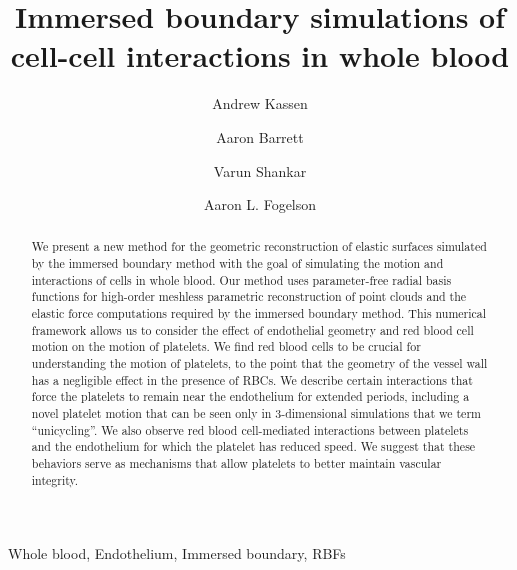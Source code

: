 \documentclass[1p,preprint,fleqn,number,sort&compress,times]{elsarticle}
\begin{document}
\begin{frontmatter}

\title{Immersed boundary simulations of cell-cell interactions in whole blood}

\author[1]{Andrew Kassen}  
\author[1]{Aaron Barrett}               
\author[2]{Varun Shankar}               
\author[1]{Aaron L. Fogelson}  

\address[1]{Department of Mathematics, University of Utah, Salt Lake City, UT 84112, USA}
\address[2]{School of Computing, University of Utah, Salt Lake City, UT 84112, USA}
\address[3]{Department of Bioengineering, University of Utah, Salt Lake City, UT 84112, USA}


\begin{abstract}
We present a new method for the geometric reconstruction of elastic surfaces simulated by
the immersed boundary method with the goal of simulating the motion and interactions of
cells in whole blood. Our method uses parameter-free radial basis functions for
high-order meshless parametric reconstruction of point clouds and the elastic force
computations required by the immersed boundary method. This numerical framework allows us
to consider the effect of endothelial geometry and red blood cell motion on the motion of
platelets. We find red blood cells to be crucial for understanding the motion of
platelets, to the point that the geometry of the vessel wall has a negligible effect in
the presence of RBCs. We describe certain interactions that force the platelets to remain
near the endothelium for extended periods, including a novel platelet motion that can be
seen only in 3-dimensional simulations that we term ``unicycling''. We also observe red
blood cell-mediated interactions between platelets and the endothelium for which the
platelet has reduced speed. We suggest that these behaviors serve as mechanisms that
allow platelets to better maintain vascular integrity.
\end{abstract}

\begin{keyword}
    Whole blood,
    Endothelium,
    Immersed boundary,
    RBFs
\end{keyword}

\end{frontmatter}





\appendix


\end{document}
